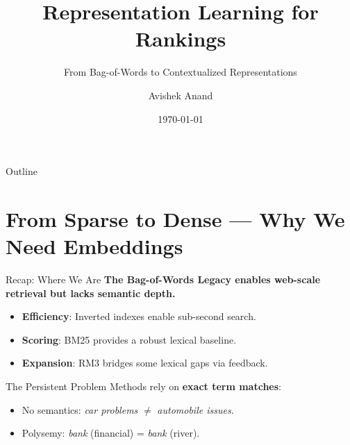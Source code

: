 \documentclass[aspectratio=169]{beamer}
\title[Lecture 4: Embeddings \& Re-ranking]{Representation Learning for Rankings}
\subtitle{From Bag-of-Words to Contextualized Representations}
\author{Avishek Anand}
\institute{Information Retrieval}
\date{\today}
\newif\ifanimated
\newcommand{\cpause}{\ifanimated\pause\fi}
\begin{document}
\begin{frame}
\titlepage
\end{frame}

\begin{frame}{Outline}
\tableofcontents
\end{frame}

\section{From Sparse to Dense --- Why We Need Embeddings}

\begin{frame}[plain]
\sectionpage
\end{frame}

\begin{frame}{Recap: Where We Are}
\textbf{The Bag-of-Words Legacy enables web-scale retrieval but lacks semantic depth.}

\vspace{0.8em}
\begin{itemize}
    \item \textbf{Efficiency}: Inverted indexes enable sub-second search.
    \item \textbf{Scoring}: BM25 provides a robust lexical baseline.
    \item \textbf{Expansion}: RM3 bridges some lexical gaps via feedback.
\end{itemize}\cpause

\vspace{1em}
\begin{alertblock}{The Persistent Problem}
Methods rely on \textbf{exact term matches}:
\begin{itemize}
    \item No semantics: \textit{car problems} $\neq$ \textit{automobile issues}.
    \item Polysemy: \textit{bank} (financial) = \textit{bank} (river).
\end{itemize}
\end{alertblock}
\end{frame}
\end{document}
